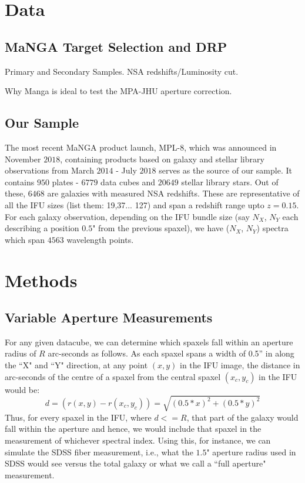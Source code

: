 \section{Data}

\subsection{MaNGA Target Selection and DRP}
\label{mangadrp}
Primary and Secondary Samples. NSA redshifts/Luminosity cut.


Why Manga is ideal to test the MPA-JHU aperture correction.

\subsection{Our Sample}
The most recent MaNGA product launch, MPL-$8$, which was announced in November $2018$, containing products based on galaxy and stellar library observations from March $2014$ - July $2018$ serves as the source of our sample. It contains $950$ plates - $6779$ data cubes and $20649$ stellar library stars. Out of these, $6468$ are galaxies with measured NSA redshifts. These are representative of all the IFU sizes (list them: 19,37... 127) and span a redshift range upto $z = 0.15$.\\
For each galaxy observation, depending on the IFU bundle size (say $N_{X}$, $N_{Y}$ each describing a position $0.5$" from the previous spaxel), we have ($N_{X}$, $N_{Y}$) spectra which span $4563$ wavelength points. 

\section{Methods}
\label{sec:chap2methods}

\subsection{Variable Aperture Measurements}
For any given datacube, we can determine which spaxels fall within an aperture radius of $R$ arc-seconds as follows. As each spaxel spans a width of 0.5'' in along the ``X" and ``Y" direction, at any point $(x,y)$ in the IFU image, the distance in arc-seconds of the centre of a spaxel from the central spaxel $(x_{c},y_{c})$ in the IFU would be:
$$ d = (r(x,y) - r(x_{c},y_{c})) = \sqrt{(0.5*x)^2 + (0.5*y)^2} $$
Thus, for every spaxel in the IFU, where $d<=R$, that part of the galaxy would fall within the aperture and hence, we would include that spaxel in the measurement of whichever spectral index. Using this, for instance, we can simulate the SDSS fiber measurement, i.e.,  what the $1.5$" aperture radius used in SDSS would see versus the total galaxy or what we call a ``full aperture" measurement.

